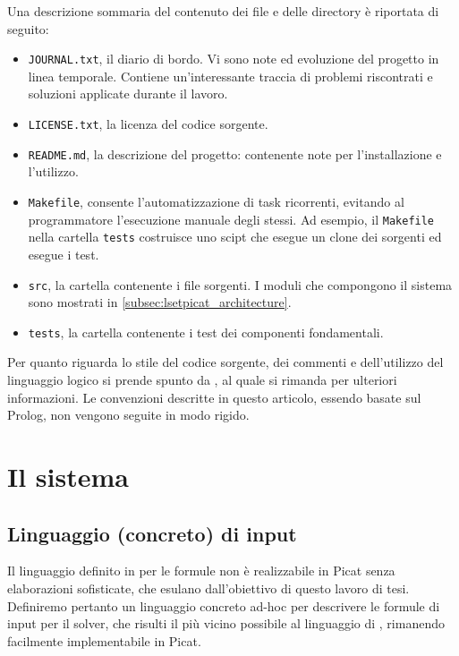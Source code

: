 \documentclass[12pt,a4paper,openright]{book} %
\begin{document}
Una descrizione sommaria del contenuto dei file e delle directory è
riportata di seguito:
\begin{itemize}
	\item \texttt{JOURNAL.txt}, il diario di bordo. Vi sono note
          ed evoluzione del progetto in linea temporale. Contiene
          un'interessante traccia di problemi riscontrati e soluzioni
          applicate durante il lavoro.
	\item \texttt{LICENSE.txt}, la licenza del codice sorgente.
	\item \texttt{README.md}, la descrizione del progetto:
          contenente note per l'installazione e l'utilizzo.
	\item \texttt{Makefile}, consente l'automatizzazione di task
          ricorrenti, evitando al programmatore l'esecuzione manuale
          degli stessi. Ad esempio, il \texttt{Makefile} nella
          cartella \texttt{tests} costruisce uno scipt che esegue un
          clone dei sorgenti ed esegue i test.
	\item \texttt{src}, la cartella contenente i file sorgenti. I
          moduli che compongono il sistema sono mostrati in
          \ref{subsec:lsetpicat_architecture}.
	\item \texttt{tests}, la cartella contenente i test dei
          componenti fondamentali.
\end{itemize}

Per quanto riguarda lo stile del codice sorgente, dei commenti e
dell'utilizzo del linguaggio logico si prende spunto da
\cite{Covington12}, al quale si rimanda per ulteriori informazioni. Le
convenzioni descritte in questo articolo, essendo basate sul Prolog,
non vengono seguite in modo rigido.

\section{Il sistema}
\label{sec:lsetpicat_system}

\subsection{Linguaggio (concreto) di input}
\label{subsec:lsetpicat_concretelang}

Il linguaggio definito in \lset{} per le formule non è realizzabile in
Picat senza elaborazioni sofisticate, che esulano dall’obiettivo di
questo lavoro di tesi. Definiremo pertanto un linguaggio concreto
ad-hoc per descrivere le formule di input per il solver, che risulti
il più vicino possibile al linguaggio di \lset{}, rimanendo facilmente
implementabile in Picat.
\end{document}
